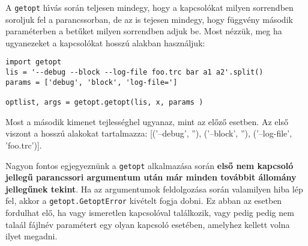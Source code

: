 A {\tt getopt} h\'{\i}v\'as sor\'an teljesen mindegy, hogy a kapcsol\'okat milyen sorrendben soroljuk 
fel a parancssorban, de az is tejesen mindegy, hogy f\"uggv\'eny m\'asodik param\'eterben a bet\H{u}ket 
milyen sorrendben adjuk be. Most n\'ezz\"uk, meg ha ugyanezeket a kapcsol\'okat hossz\'u alakban 
haszn\'aljuk:

\begin{Verbatim}[fontsize=\small]
import getopt
lis = '--debug --block --log-file foo.trc bar a1 a2'.split()
params = ['debug', 'block', 'log-file=']

optlist, args = getopt.getopt(lis, x, params )
\end{Verbatim}

\noindent Most a m\'asodik kimenet tejless\'eghel ugyanaz, mint az el\H{o}z\H{o} esetben. Az els\H{o} 
viszont a hossz\'u alakokat tartalmazza: [('--debug', ''), ('--block', ''), ('--log-file', 'foo.trc')]. 

Nagyon fontos egjegyezn\"unk a {\tt getopt} alkalmaz\'asa sor\'an {\bf els\H{o} nem kapcsol\'o jelleg\H{u} 
parancssori argumentum ut\'an m\'ar minden tov\'abbit \'allom\'any jelleg\H{u}nek tekint}. Ha az argumentumok 
feldolgoz\'asa sor\'an valamilyen hiba l\'ep fel, akkor a {\tt getopt.GetoptError} kiv\'etelt fogja dobni. 
Ez abban az esetben fordulhat el\H{o}, ha vagy ismeretlen kapcsol\'oval tal\'alkozik, vagy pedig pedig nem 
tala\'al f\'ajln\'ev param\'etert egy olyan kapcsol\'o eset\'eben, amelyhez kellett volna ilyet megadni. 


